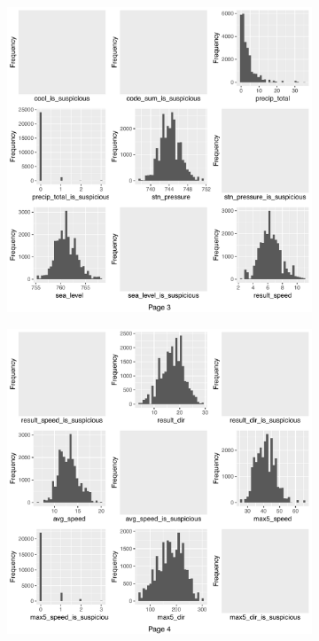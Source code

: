 \begin{figure}[htb]
\begin{subfigure}[t]{0.49\textwidth}
	\end{subfigure}
	\begin{subfigure}[t]{0.49\textwidth}
		\includegraphics[width=\textwidth]{images/ml/plot_histogram3}
	\end{subfigure}
	\begin{subfigure}[t]{0.49\textwidth}
		\includegraphics[width=\textwidth]{images/ml/plot_histogram4}
	\end{subfigure}
\end{figure}
